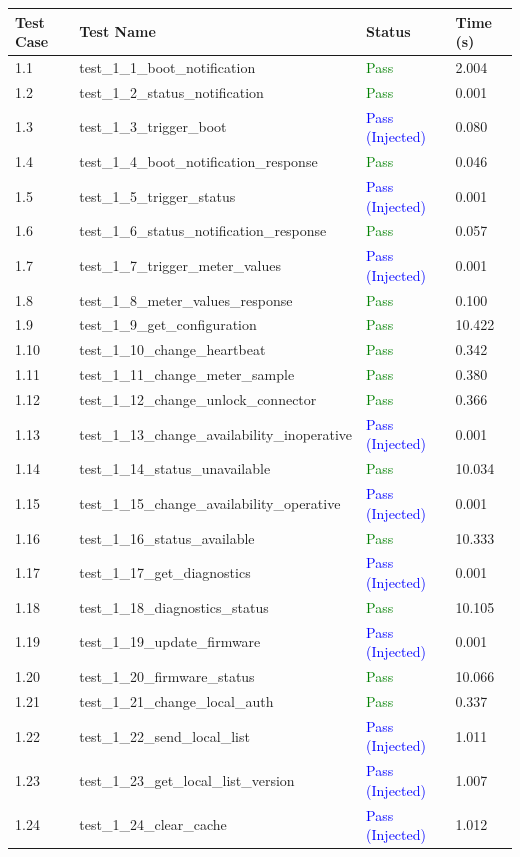 \documentclass{article}
\begin{document}
\begin{longtable}{p{} p{} p{} p{}}
\toprule
\textbf{Test Case} & \textbf{Test Name} & \textbf{Status} & \textbf{Time (s)} \\
\midrule
\endhead
1.1 & test\_1\_1\_boot\_notification & \textcolor{green}{Pass} & 2.004 \\
1.2 & test\_1\_2\_status\_notification & \textcolor{green}{Pass} & 0.001 \\
1.3 & test\_1\_3\_trigger\_boot & \textcolor{blue}{Pass (Injected)} & 0.080 \\
1.4 & test\_1\_4\_boot\_notification\_response & \textcolor{green}{Pass} & 0.046 \\
1.5 & test\_1\_5\_trigger\_status & \textcolor{blue}{Pass (Injected)} & 0.001 \\
1.6 & test\_1\_6\_status\_notification\_response & \textcolor{green}{Pass} & 0.057 \\
1.7 & test\_1\_7\_trigger\_meter\_values & \textcolor{blue}{Pass (Injected)} & 0.001 \\
1.8 & test\_1\_8\_meter\_values\_response & \textcolor{green}{Pass} & 0.100 \\
1.9 & test\_1\_9\_get\_configuration & \textcolor{green}{Pass} & 10.422 \\
1.10 & test\_1\_10\_change\_heartbeat & \textcolor{green}{Pass} & 0.342 \\
1.11 & test\_1\_11\_change\_meter\_sample & \textcolor{green}{Pass} & 0.380 \\
1.12 & test\_1\_12\_change\_unlock\_connector & \textcolor{green}{Pass} & 0.366 \\
1.13 & test\_1\_13\_change\_availability\_inoperative & \textcolor{blue}{Pass (Injected)} & 0.001 \\
1.14 & test\_1\_14\_status\_unavailable & \textcolor{green}{Pass} & 10.034 \\
1.15 & test\_1\_15\_change\_availability\_operative & \textcolor{blue}{Pass (Injected)} & 0.001 \\
1.16 & test\_1\_16\_status\_available & \textcolor{green}{Pass} & 10.333 \\
1.17 & test\_1\_17\_get\_diagnostics & \textcolor{blue}{Pass (Injected)} & 0.001 \\
1.18 & test\_1\_18\_diagnostics\_status & \textcolor{green}{Pass} & 10.105 \\
1.19 & test\_1\_19\_update\_firmware & \textcolor{blue}{Pass (Injected)} & 0.001 \\
1.20 & test\_1\_20\_firmware\_status & \textcolor{green}{Pass} & 10.066 \\
1.21 & test\_1\_21\_change\_local\_auth & \textcolor{green}{Pass} & 0.337 \\
1.22 & test\_1\_22\_send\_local\_list & \textcolor{blue}{Pass (Injected)} & 1.011 \\
1.23 & test\_1\_23\_get\_local\_list\_version & \textcolor{blue}{Pass (Injected)} & 1.007 \\
1.24 & test\_1\_24\_clear\_cache & \textcolor{blue}{Pass (Injected)} & 1.012 \\
\bottomrule
\end{longtable}
\end{document}
